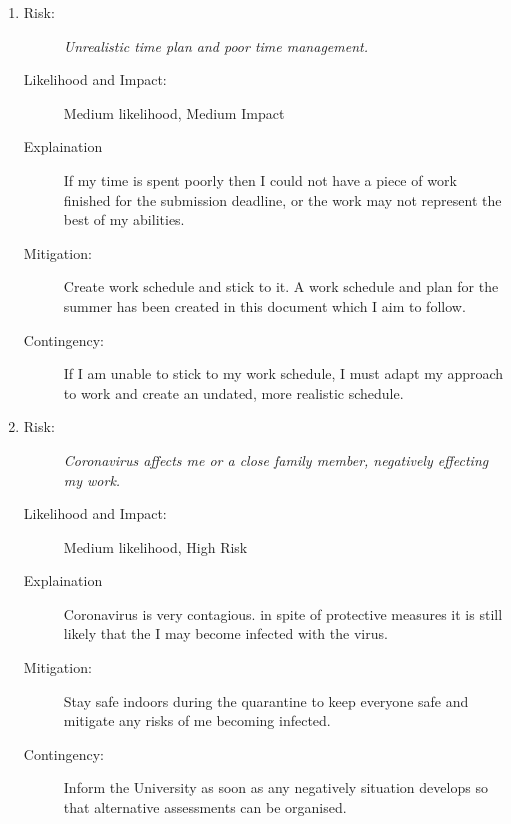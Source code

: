 \documentclass{article}
\begin{document}
\begin{enumerate}
    \item 
    \begin{description}
        \item[Risk:]    
        \emph{Unrealistic time plan and poor time management.}
        \item[Likelihood and Impact:]
        Medium likelihood, Medium Impact
        \item[Explaination]
        If my time is spent poorly then I could not have a piece of work finished for the submission deadline, or the work may not represent the best of my abilities.  
        \item[Mitigation:]
        Create work schedule and stick to it.
        A work schedule and plan for the summer has been created in this document which I aim to follow.
        \item[Contingency:]
        If I am unable to stick to my work schedule, I must adapt my approach to work and create an undated, more realistic schedule.
    \end{description}

    \item 
    \begin{description}
        \item[Risk:]
        \emph{Coronavirus affects me or a close family member, negatively effecting my work.}
        \item[Likelihood and Impact:]
        Medium likelihood, High Risk
        \item[Explaination]
        Coronavirus is very contagious. 
        in spite of protective measures it is still likely that the I may become infected with the virus. 
        \item[Mitigation:]
        Stay safe indoors during the quarantine to keep everyone safe and mitigate any risks of me becoming infected.
        \item[Contingency:]
        Inform the University as soon as any negatively situation develops so that alternative assessments can be organised.
    \end{description}


\end{enumerate}
\end{document}

